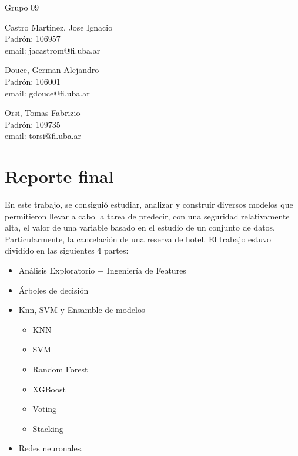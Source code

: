 \documentclass{article}
\begin{document}
\begin{titlepage}
  \vspace{0.4cm}
  \begin{center}
    {\Large{Grupo 09}}\\
    \vspace{0.6cm}
    {\begin{minipage}[t]{.32\textwidth}
        \begin{center}
	Castro  Martinez, Jose Ignacio\\
          {\small{Padrón: 106957}}\\
          {\small{email: jacastrom@fi.uba.ar}}
        \end{center}
	\end{minipage}
	\begin{minipage}[t]{.32\textwidth}
        \begin{center}
	Douce, German Alejandro\\
          {\small{Padrón: 106001}}\\
          {\small{email: gdouce@fi.uba.ar}}\\
        \end{center}
      \end{minipage}
      \begin{minipage}[t]{.32\textwidth}
        \begin{center}
          Orsi, Tomas Fabrizio\\
          {\small{Padrón: 109735}}\\
          {\small{email: torsi@fi.uba.ar}}
        \end{center}
      \end{minipage}}
  \end{center}
\end{titlepage}

\section*{Reporte final}
En este trabajo, se consiguió estudiar, analizar y construir diversos modelos que permitieron llevar a cabo la tarea de predecir, con una seguridad relativamente alta, el valor de una variable basado en el estudio de un conjunto de datos. Particularmente, la cancelación de una reserva de hotel.
El trabajo estuvo dividido en las siguientes 4 partes:
\begin{itemize}
	\item Análisis Exploratorio + Ingeniería de Features
	\item Árboles de decisión
	\item Knn, SVM  y Ensamble de modelos
	\begin{itemize}
		\item KNN
		\item SVM
		\item Random Forest
		\item XGBoost
		\item Voting
		\item Stacking
	\end{itemize}
	\item Redes neuronales.
\end{itemize}
\end{document}
